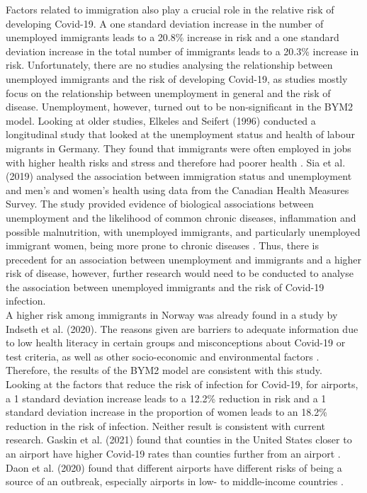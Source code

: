 Factors related to immigration also play a crucial role in the relative risk of developing Covid-19. A one standard deviation increase in the number of unemployed immigrants leads to a 20.8\% increase in risk and a one standard deviation increase in the total number of immigrants leads to a 20.3\% increase in risk. Unfortunately, there are no studies analysing the relationship between unemployed immigrants and the risk of developing Covid-19, as studies mostly focus on the relationship between unemployment in general and the risk of disease. Unemployment, however, turned out to be non-significant in the BYM2 model. Looking at older studies, Elkeles and Seifert (1996) conducted a longitudinal study that looked at the unemployment status and health of labour migrants in Germany. They found that immigrants were often employed in jobs with higher health risks and stress and therefore had poorer health \autocite[][]{elkeles1996immigrants}. Sia et al. (2019) analysed the association between immigration status and unemployment and men's and women's health using data from the Canadian Health Measures Survey. The study provided evidence of biological associations between unemployment and the likelihood of common chronic diseases, inflammation and possible malnutrition, with unemployed immigrants, and particularly unemployed immigrant women, being more prone to chronic diseases \autocite[][]{sia2019chronic}. Thus, there is precedent for an association between unemployment and immigrants and a higher risk of disease, however, further research would need to be conducted to analyse the association between unemployed immigrants and the risk of Covid-19 infection. \\
A higher risk among immigrants in Norway was already found in a study by Indseth et al. (2020). The reasons given are barriers to adequate information due to low health literacy in certain groups and misconceptions about Covid-19 or test criteria, as well as other socio-economic and environmental factors \autocite[][]{indseth2020covid}. Therefore, the results of the BYM2 model are consistent with this study. \\
Looking at the factors that reduce the risk of infection for Covid-19, for airports, a 1 standard deviation increase leads to a 12.2\% reduction in risk and a 1 standard deviation increase in the proportion of women leads to an 18.2\% reduction in the risk of infection. Neither result is consistent with current research. Gaskin et al. (2021) found that counties in the United States closer to an airport have higher Covid-19 rates than counties further from an airport \autocite[][]{gaskin2021geographic}. Daon et al. (2020) found that different airports have different risks of being a source of an outbreak, especially airports in low- to middle-income countries \autocite[][]{daon2020estimating}. \\

